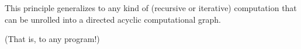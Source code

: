 \documentclass{beamer}
\begin{document}
\begin{frame}

\end{frame}

\begin{frame}

    {\color{red}
    This principle generalizes to any kind of (recursive or iterative) computation that can be unrolled into a directed acyclic  computational graph.}

    \vspace{1cm}

    (That is, to any program!)
\end{frame}
\end{document}
